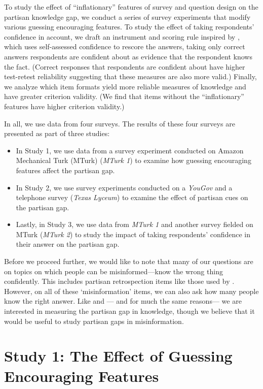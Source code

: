 \documentclass[12pt, letterpaper]{article}
\begin{document}
To study the effect of ``inflationary'' features of survey and question design on the partisan knowledge gap, we conduct a series of survey experiments that modify various guessing encouraging features. To study the effect of taking respondents' confidence in account, we draft an instrument and scoring rule inspired by \citet{pasek2015}, which uses self-assessed confidence to rescore the answers, taking only correct answers respondents are confident about as evidence that the respondent knows the fact. (Correct responses that respondents are confident about have higher test-retest reliability \citep{graham2021measuring} suggesting that these measures are also more valid.) Finally, we analyze which item formats yield more reliable measures of knowledge and have greater criterion validity. (We find that items without the ``inflationary'' features have higher criterion validity.)

In all, we use data from four surveys. The results of these four surveys are presented as part of three studies:

\begin{itemize}
    \item In Study 1, we use data from a survey experiment conducted on Amazon Mechanical Turk (MTurk) (\emph{MTurk 1}) to examine how guessing encouraging features affect the partisan gap. 
    \item In Study 2, we use survey experiments conducted on a \emph{YouGov} and a telephone survey (\emph{Texas Lyceum}) to examine the effect of partisan cues on the partisan gap.
    \item Lastly, in Study 3, we use data from \emph{MTurk 1} and another survey fielded on MTurk (\emph{MTurk 2}) to study the impact of taking respondents' confidence in their answer on the partisan gap.
\end{itemize}

Before we proceed further, we would like to note that many of our questions are on topics on which people can be misinformed---know the wrong thing confidently. This includes partisan retrospection items like those used by \cite{bartels_2002}. However, on all of these `misinformation' items, we can also ask how many people know the right answer. Like \citet{bartels_2002} and \citet{prior2015you}--- and for much the same reasons--- we are interested in measuring the partisan gap in knowledge, though we believe that it would be useful to study partisan gaps in misinformation. 

\section*{Study 1: The Effect of Guessing Encouraging Features} \label{sec:inflationary_measures}
\end{document}
